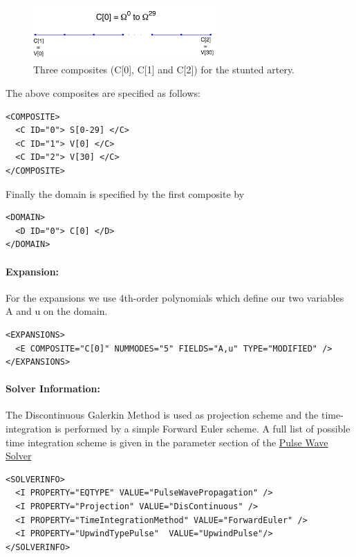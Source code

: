 \begin{figure}
\begin{center}
\includegraphics[width=7cm]{Figures/StentComposite.png}
\caption{Three composites (C[0], C[1] and C[2]) for the stunted artery.}
\end{center}
\end{figure}

The above composites are specified as follows:
\begin{lstlisting}[style=XMLStyle]
<COMPOSITE>
  <C ID="0"> S[0-29] </C>
  <C ID="1"> V[0] </C>
  <C ID="2"> V[30] </C>
</COMPOSITE>
\end{lstlisting}

Finally the domain is specified by the first composite by
\begin{lstlisting}[style=XMLStyle]
<DOMAIN> 
  <D ID="0"> C[0] </D>
</DOMAIN>
\end{lstlisting}

\paragraph{Expansion:~}For the expansions we use 4th-order polynomials which define our two variables A and u on the domain. 

\begin{lstlisting}[style=XMLStyle]
<EXPANSIONS>
  <E COMPOSITE="C[0]" NUMMODES="5" FIELDS="A,u" TYPE="MODIFIED" />
</EXPANSIONS>
\end{lstlisting}

\paragraph{Solver Information:~}The Discontinuous Galerkin Method is used as projection scheme and the time-integration is performed by a simple Forward Euler scheme. A full list of possible time integration scheme is given in the parameter section of the  \hyperref[PulseWaveSolver]{Pulse Wave Solver}
\begin{lstlisting}[style=XMLStyle] 
<SOLVERINFO>
  <I PROPERTY="EQTYPE" VALUE="PulseWavePropagation" />
  <I PROPERTY="Projection" VALUE="DisContinuous" />
  <I PROPERTY="TimeIntegrationMethod" VALUE="ForwardEuler" />
  <I PROPERTY="UpwindTypePulse"  VALUE="UpwindPulse"/> 
</SOLVERINFO>
\end{lstlisting}

